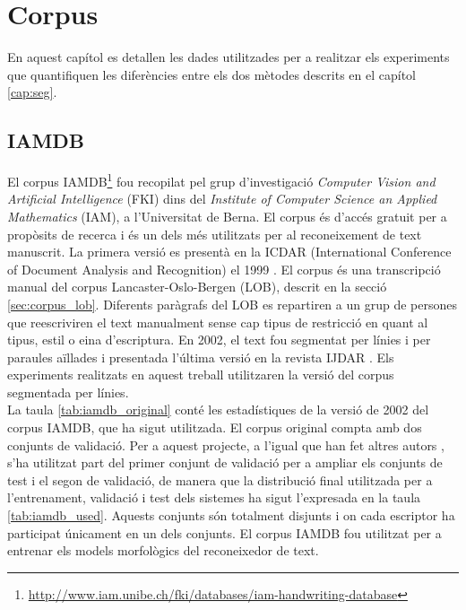 \chapter{Corpus}
\label{cap:corpus}
En aquest capítol es detallen les dades utilitzades per a realitzar els experiments que quantifiquen les diferències entre els dos mètodes descrits en el capítol \ref{cap:seg}.

\section{IAMDB}\label{sec:corpus_iamdb}
El corpus IAMDB\footnote{\url{http://www.iam.unibe.ch/fki/databases/iam-handwriting-database}} fou recopilat pel grup d'investigació \emph{Computer Vision and Artificial Intelligence} (FKI) dins del \emph{Institute of Computer Science an Applied Mathematics} (IAM), a l'Universitat de Berna. El corpus és d'accés gratuit per a propòsits de recerca i és un dels més utilitzats per al reconeixement de text manuscrit. La primera versió es presentà en la ICDAR (International Conference of Document Analysis and Recognition) el 1999 \cite{MB99}. El corpus és una transcripció manual del corpus Lancaster-Oslo-Bergen (LOB), descrit en la secció \ref{sec:corpus_lob}. Diferents paràgrafs del LOB es repartiren a un grup de persones que reescriviren el text manualment sense cap tipus de restricció en quant al tipus, estil o eina d'escriptura. En 2002, el text fou segmentat per línies i per paraules aïllades \cite{ZB02} i presentada l'última versió en la revista IJDAR \cite{MB02}. Els experiments realitzats en aquest treball utilitzaren la versió del corpus segmentada per línies.\\

La taula \ref{tab:iamdb_original} conté les estadístiques de la versió de 2002 del corpus IAMDB, que ha sigut utilitzada. El corpus original compta amb dos conjunts de validació. Per a aquest projecte, a l'igual que han fet altres autors \cite{bertolami2008ensemble, graves2009novel, espana2011improving}, s'ha utilitzat part del primer conjunt de validació per a ampliar els conjunts de test i el segon de validació, de manera que la distribució final utilitzada per a l'entrenament, validació i test dels sistemes ha sigut l'ex\-pre\-sa\-da en la taula \ref{tab:iamdb_used}. Aquests conjunts són totalment disjunts i on cada escriptor ha participat únicament en un dels conjunts. El corpus IAMDB fou utilitzat per a entrenar els models morfològics del reconeixedor de text.\\

